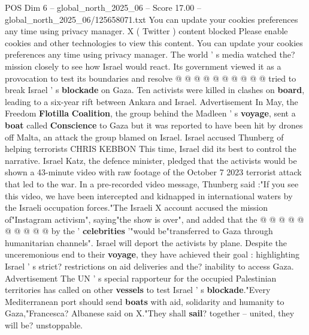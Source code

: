 \begin{textsample}{POS Dim 6 – global\_north\_2025\_06 – Score 17.00 – global\_north\_2025\_06/125658071.txt}
You can update your cookies preferences any time using privacy manager.
X ( Twitter ) content blocked Please enable cookies and other technologies to view this content.
You can update your cookies preferences any time using privacy manager.
The world ' s media watched the? mission closely to see how Israel would react.
Its government viewed it as a provocation to test its boundaries and resolve @ @ @ @ @ @ @ @ @ @ tried to break Israel ' s \textbf{blockade} on Gaza.
Ten activists were killed in clashes on \textbf{board}, leading to a six-year rift between Ankara and Israel.
Advertisement In May, the Freedom \textbf{Flotilla} \textbf{Coalition}, the group behind the Madleen ' s \textbf{voyage}, sent a \textbf{boat} called \textbf{Conscience} to Gaza but it was reported to have been hit by drones off Malta, an attack the group blamed on Israel.
Israel accused Thunberg of helping terrorists CHRIS KEBBON This time, Israel did its best to control the narrative.
Israel Katz, the defence minister, pledged that the activists would be shown a 43-minute video with raw footage of the October 7 2023 terrorist attack that led to the war.
In a pre-recorded video message, Thunberg said :"If you see this video, we have been intercepted and kidnapped in international waters by the Israeli occupation forces."The Israeli X account accused the mission of"Instagram activism", saying"the show is over", and added that the @ @ @ @ @ @ @ @ @ @ by the ' \textbf{celebrities} '"would be"transferred to Gaza through humanitarian channels".
Israel will deport the activists by plane.
Despite the unceremonious end to their \textbf{voyage}, they have achieved their goal : highlighting Israel ' s strict? restrictions on aid deliveries and the? inability to access Gaza.
Advertisement The UN ' s special rapporteur for the occupied Palestinian territories has called on other \textbf{vessels} to test Israel ' s \textbf{blockade}."Every Mediterranean port should send \textbf{boats} with aid, solidarity and humanity to Gaza,"Francesca?
Albanese said on X."They shall \textbf{sail}? together -- united, they will be? unstoppable.

\end{textsample}
